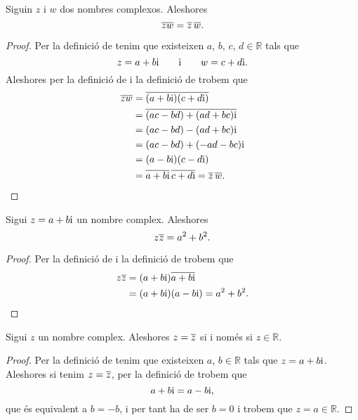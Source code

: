 \documentclass[../../Main.tex]{subfiles}
\begin{document}
	\begin{proposition}
		\label{prop:el conjugat del producte és el producte de conjugats}
		Siguin \(z\) i \(w\) dos nombres complexos. Aleshores
		\[\overline{zw}=\overline{z}\,\overline{w}.\]
		\begin{proof}
			Per la definició de  tenim que existeixen \(a\), \(b\), \(c\), \(d\in\mathbb{R}\) tals que
			\[z=a+b\mathrm{i}\qquad\text{i}\qquad w=c+d\mathrm{i}.\]
			Aleshores per la definició de  i la definició de  trobem que
			\begin{align*}
				\overline{zw}&=\overline{(a+b\mathrm{i})(c+d\mathrm{i})} \\
				&=\overline{(ac-bd)+(ad+bc)\mathrm{i}} \\
				&=(ac-bd)-(ad+bc)\mathrm{i} \\
				&=(ac-bd)+(-ad-bc)\mathrm{i} \\
				&=(a-b\mathrm{i})(c-d\mathrm{i}) \\
				&=\overline{a+b\mathrm{i}}\,\overline{c+d\mathrm{i}}=\overline{z}\,\overline{w}\qedhere.
			\end{align*}
		\end{proof}
	\end{proposition}
	\begin{proposition}
		\label{prop:el producte d'un nombre complex pel seu conjugat és la suma dels quadrats de la seva part real i imaginaria}
		Sigui \(z=a+b\mathrm{i}\) un nombre complex. Aleshores
		\[z\overline{z}=a^{2}+b^{2}.\]
		\begin{proof}
			Per la definició de  i la definició de  trobem que
			\begin{align*}
				z\overline{z}&=(a+b\mathrm{i})\overline{a+b\mathrm{i}} \\
				&=(a+b\mathrm{i})(a-b\mathrm{i})=a^{2}+b^{2}.\qedhere
			\end{align*}
		\end{proof}
	\end{proposition}
	\begin{proposition}
		\label{prop:un nombre complex és igual al seu conjugat si i només si és un real}
		Sigui \(z\) un nombre complex. Aleshores \(z=\overline{z}\) si i només si \(z\in\mathbb{R}\).
		\begin{proof}
			Per la definició de  tenim que existeixen \(a\), \(b\in\mathbb{R}\) tals que \(z=a+b\mathrm{i}\). Aleshores si tenim \(z=\overline{z}\), per la definició de  trobem que
			\[a+b\mathrm{i}=a-b\mathrm{i},\]
			que és equivalent a \(b=-b\), i per tant ha de ser \(b=0\) i trobem que \(z=a\in\mathbb{R}\).
		\end{proof}
	\end{proposition}
\end{document}
